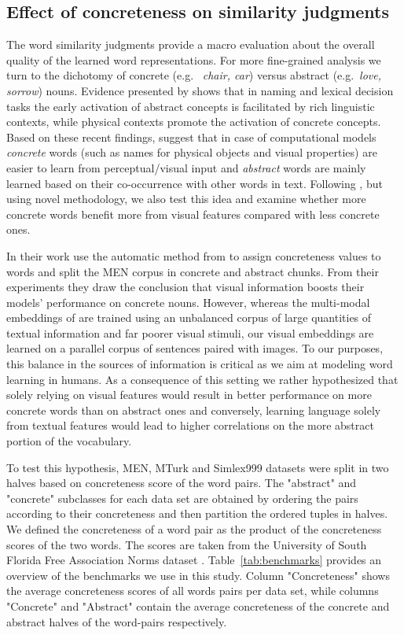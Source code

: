 \subsection{Effect of concreteness on similarity judgments}
\label{sec:effect-concrete}
The word similarity judgments provide a macro evaluation about the
overall quality of the learned word representations. For more
fine-grained analysis we turn to the dichotomy of concrete (e.g.\ {\it
  chair, car}) versus abstract (e.g.\ {\it love, sorrow}) nouns.
Evidence presented by \cite{recchia2012semantic} shows that in naming
and lexical decision tasks the early activation of abstract concepts
is facilitated by rich linguistic contexts, while physical contexts
promote the activation of concrete concepts. Based on these recent
findings, \cite{bruni2014multimodal} suggest that in case of
computational models {\it concrete} words (such as names for physical
objects and visual properties) are easier to learn from
perceptual/visual input and {\it abstract} words are mainly learned
based on their co-occurrence with other words in text.  Following
\cite{bruni2014multimodal}, but using novel methodology, we also test
this idea and examine whether more concrete words benefit more from
visual features compared with less concrete ones.

In their work \cite{bruni2014multimodal} use the automatic method from \cite{turney2011literal}
to assign concreteness values to words and split the MEN corpus in
concrete and abstract chunks. From their experiments they draw the
conclusion that visual information boosts their models' performance on
concrete nouns. However, whereas the multi-modal embeddings of
\cite{bruni2014multimodal} are trained using an unbalanced corpus of
large quantities of textual information and far poorer visual stimuli,
our visual embeddings are learned on a parallel corpus of sentences
paired with images. To our purposes, this balance in the sources of
information is critical as we aim at modeling word learning in humans.
As a consequence of this setting we rather hypothesized that solely relying on visual features would result
in better performance on more concrete words than on abstract ones and
conversely, learning language solely from textual features would lead to
higher correlations on the more abstract portion of the vocabulary.

To test this hypothesis, MEN, MTurk and Simlex999 datasets were
split in two halves based on concreteness score of the word pairs.
The "abstract" and "concrete" subclasses for each data set are obtained
by ordering the pairs according to their concreteness and then partition
the ordered tuples in halves\label{rev:partition_concreteness}.
We defined the concreteness of a word pair as the product of the
concreteness scores of the two words. The scores are taken from
the University of South Florida
Free Association Norms dataset \citep{nelsonuniversity}.
Table~\ref{tab:benchmarks} provides an overview of the benchmarks we use in this study.
Column "Concreteness" shows the average concreteness scores of all words pairs per data set,
while columns "Concrete" and "Abstract" contain the average concreteness of the concrete
and abstract halves of the word-pairs respectively.


